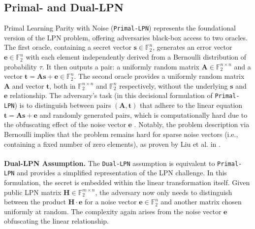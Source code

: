 \subsection{Primal- and Dual-LPN}
Primal Learning Parity with Noise (\texttt{Primal-LPN}) represents the foundational version of the LPN problem, offering adversaries black-box access to two oracles. The first oracle, containing a secret vector \( \mathbf{s} \in \mathbb{F}_2^{n} \), generates an error vector \( \mathbf{e} \in \mathbb{F}_2^{n} \) with each element independently derived from a Bernoulli distribution of probability \( \tau \). It then outputs a pair: a uniformly random matrix \( \mathbf{A} \in \mathbb{F}_2^{n\times n} \) and a vector \( \mathbf{t} = \mathbf{A}\mathbf{s} + \mathbf{e} \in \mathbb{F}_2^{n} \). The second oracle provides a uniformly random matrix \( \mathbf{A} \) and vector \( \mathbf{t} \), both in \( \mathbb{F}_2^{n\times n} \) and \( \mathbb{F}_2^{n} \) respectively, without the underlying \( \mathbf{s} \) and \( \mathbf{e} \) relationship. The adversary's task (in this decisional formulation of \texttt{Primal-LPN}) is to distinguish between pairs \((\mathbf{A}, \mathbf{t})\) that adhere to the linear equation \(\mathbf{t} = \mathbf{A}\mathbf{s} + \mathbf{e}\) and randomly generated pairs, which is computationally hard due to the obfuscating effect of the noise vector \( \mathbf{e} \) \cite{zhao2018hardness}. Notably, the problem description via Bernoulli implies that the problem remains hard for sparse noise vectors (i.e., containing a fixed number of zero elements), as proven by Liu et al. in \cite{liu2017hardness}.
\\\\
\textbf{Dual-LPN Assumption.} The \texttt{Dual-LPN} assumption is equivalent to \texttt{Primal-LPN} \cite{couteau2021silver} and provides a simplified representation of the LPN challenge. In this formulation, the secret is embedded within the linear transformation itself. Given public LPN matrix $\mathbf{H} \in \mathbb{F}_2^{m \times n}$, the adversary now only needs to distinguish between the product $\mathbf{H} \cdot \mathbf{e}$ for a noise vector $\mathbf{e}\in \mathbb{F}_2^{n}$ and another matrix chosen uniformly at random. The complexity again arises from the noise vector \(\mathbf{e}\) obfuscating the linear relationship.

